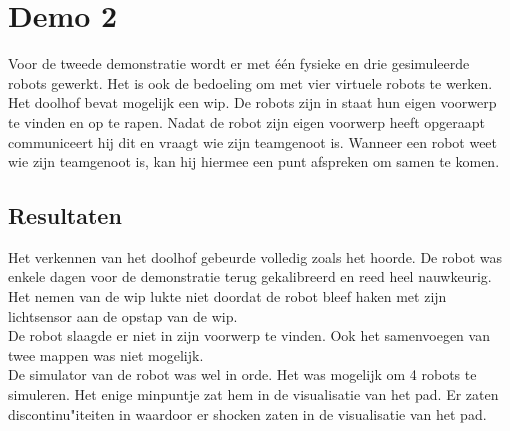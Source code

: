 \documentclass[tt3]{penoverslag}
\begin{document}

\section{Demo 2}
\label{Asec:demo2}
Voor de tweede demonstratie wordt er met \'e\'en fysieke en drie gesimuleerde robots gewerkt. Het is ook de bedoeling om  met vier virtuele robots te werken. Het doolhof bevat mogelijk een wip. De robots zijn in staat hun eigen voorwerp te vinden en op te rapen. Nadat de robot zijn eigen voorwerp heeft opgeraapt communiceert hij dit en vraagt wie zijn teamgenoot is. Wanneer een robot weet wie zijn teamgenoot is, kan hij hiermee een punt afspreken om samen te komen.\\

\subsection{Resultaten}
\label{Assec:result2}
Het verkennen van het doolhof gebeurde volledig zoals het hoorde. De robot was enkele dagen voor de demonstratie terug gekalibreerd en reed heel nauwkeurig. Het nemen van de wip lukte niet doordat de robot bleef haken met zijn lichtsensor aan de opstap van de wip.\\
De robot slaagde er niet in zijn voorwerp te vinden. Ook het samenvoegen van twee mappen was niet mogelijk.\\
De simulator van de robot was wel in orde. Het was mogelijk om 4 robots te simuleren. Het enige minpuntje zat hem in de visualisatie van het pad. Er zaten discontinu"iteiten in waardoor er shocken zaten in de visualisatie van het pad. \\
\end{document}
